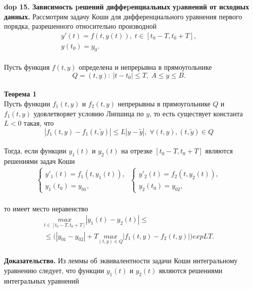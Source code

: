 \textbf{\LARGE dop 15. Зависимость pешений диффеpенциальных уpавнений от исходных данных.}
Рассмотрим задачу Коши для дифференциального уравнения первого порядка, разрешенного относительно производной
\begin{equation*}
\begin{split}
y'(t)=f(t,y(t)), \; t\in [t_0-T,t_0+T],\\
y(t_0)=y_0.
\end{split}
\end{equation*}\\
Пусть функция $f(t,y)$ определена и непрерывна в прямоугольнике
\begin{equation*}
Q={(t,y):\: |t-t_0|\leq T,\; A\leq y\leq B}.
\end{equation*}
\\
\textbf{Теорема 1}\\
Пусть функции $f_1 (t,y)$ и $f_2 (t,y)$ непрерывны в прямоугольнике $Q$ и $f_1 (t,y)$ удовлетворяет условию Липшица по $y$, то есть существует константа  $L < 0$ такая, что
\begin{equation*}
|f_1(t,y)-f_1(t,\widetilde{y})|\leq L|y-\widetilde{y}|,\; \forall(t,y), (t,\widetilde{y})\in Q
\end{equation*}\\
Тогда, если функции $y_1(t)$ и $y_2(t)$ на отрезке $[t_0-T,t_0+T]$ являются решениями задач Коши 
\begin{equation*}
\begin{split}
\begin{cases}
y'_1(t)=f_1(t,y_1(t)),\\
y_1(t_0)=y_{01},
\end{cases}
\:
\begin{cases}
y'_2(t)=f_2(t,y_2(t)),\\
y_2(t_0)=y_{02},
\end{cases}
\end{split}
\end{equation*}\\
то имеет место неравенство 
\begin{equation*}\tag{1}
\begin{split}
\underset{t\in[t_0-T,t_0+T]}{max} |y_1(t)-y_2(t)|\leq \\
\leq \big( |y_{01}-y_{02}|+T \underset{(t,y)\in Q}{max} |f_1(t,y)-f_2(t,y)|\big) exp{LT}.
\end{split}
\end{equation*}
\\
\textbf{Доказательство.} Из леммы об эквивалентности задачи Коши интегральному уравнению следует, что функции $y_1(t)$ и $y_2(t)$ являются решениями интегральных уравнений
